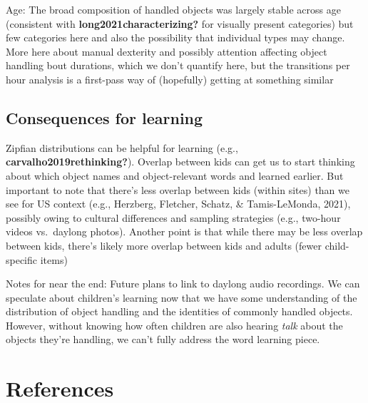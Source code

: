 \documentclass[10pt, letterpaper]{article}
\begin{document}
Age: The broad composition of handled objects was largely stable across
age (consistent with \textbf{long2021characterizing?} for visually
present categories) but few categories here and also the possibility
that individual types may change. More here about manual dexterity and
possibly attention affecting object handling bout durations, which we
don't quantify here, but the transitions per hour analysis is a
first-pass way of (hopefully) getting at something similar

\hypertarget{consequences-for-learning}{%
\subsection{Consequences for learning}\label{consequences-for-learning}}

Zipfian distributions can be helpful for learning (e.g.,
\textbf{carvalho2019rethinking?}). Overlap between kids can get us to
start thinking about which object names and object-relevant words and
learned earlier. But important to note that there's less overlap between
kids (within sites) than we see for US context (e.g., Herzberg,
Fletcher, Schatz, \& Tamis-LeMonda, 2021), possibly owing to cultural
differences and sampling strategies (e.g., two-hour videos vs.~daylong
photos). Another point is that while there may be less overlap between
kids, there's likely more overlap between kids and adults (fewer
child-specific items)

Notes for near the end: Future plans to link to daylong audio
recordings. We can speculate about children's learning now that we have
some understanding of the distribution of object handling and the
identities of commonly handled objects. However, without knowing how
often children are also hearing \emph{talk} about the objects they're
handling, we can't fully address the word learning piece.

\hypertarget{references}{%
\section{References}\label{references}}

\setlength{\parindent}{-0.1in} 
\setlength{\leftskip}{0.125in}

\noindent
\end{document}
